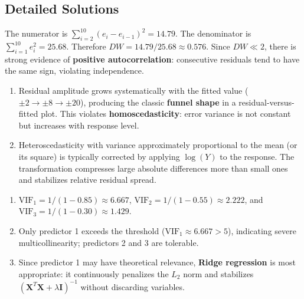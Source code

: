 \subsection*{Detailed Solutions}

\begin{solproblema}[prob:c7c2f12]
The numerator is $\sum_{i=2}^{10}(e_i-e_{i-1})^2=14.79$. The denominator is $\sum_{i=1}^{10}e_i^2=25.68$. Therefore $DW=14.79/25.68\approx0.576$. Since $DW\ll2$, there is strong evidence of \textbf{positive autocorrelation}: consecutive residuals tend to have the same sign, violating independence.
\end{solproblema}

\begin{solproblema}[prob:90810fe]
\begin{enumerate}
\item Residual amplitude grows systematically with the fitted value ($\pm2\to\pm8\to\pm20$), producing the classic \textbf{funnel shape} in a residual-versus-fitted plot. This violates \textbf{homoscedasticity}: error variance is not constant but increases with response level.
\item Heteroscedasticity with variance approximately proportional to the mean (or its square) is typically corrected by applying $\log(Y)$ to the response. The transformation compresses large absolute differences more than small ones and stabilizes relative residual spread.
\end{enumerate}
\end{solproblema}

\begin{solproblema}[prob:46ca545]
\begin{enumerate}
\item $\text{VIF}_1=1/(1-0.85)\approx6.667$, $\text{VIF}_2=1/(1-0.55)\approx2.222$, and $\text{VIF}_3=1/(1-0.30)\approx1.429$.
\item Only predictor 1 exceeds the threshold ($\text{VIF}_1\approx6.667>5$), indicating severe multicollinearity; predictors 2 and 3 are tolerable.
\item Since predictor 1 may have theoretical relevance, \textbf{Ridge regression} is most appropriate: it continuously penalizes the $L_2$ norm and stabilizes $(\mathbf X^T\mathbf X+\lambda\mathbf I)^{-1}$ without discarding variables.
\end{enumerate}
\end{solproblema}

